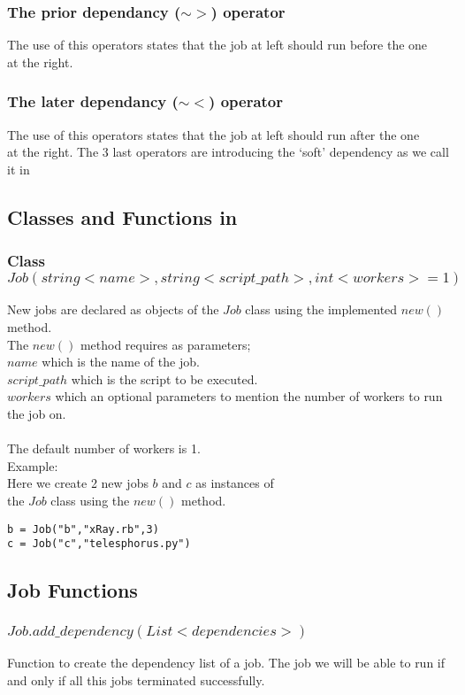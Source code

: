 \subsubsection*{The prior dependancy ($\sim>$) operator}
The use of this operators states that the job at left should run before the one\\
at the right.
\subsubsection*{The later dependancy ($\sim<$) operator}
The use of this operators states that the job at left should run after the one\\
at the right.
The 3 last operators are introducing the `soft' dependency as we call it in \lang{}\\
\subsection*{Classes and Functions in \lang{}}
\subsubsection*{Class $Job(string <name>, string <script\_path>, int <workers>=1)$}
New jobs are declared as objects of the $Job$ class using the implemented $new()$ method.\\
The $new()$ method requires as parameters;\\
$name$ which is the name of the job.\\
$script\_path$ which is the script to be executed.\\
$workers$ which an optional parameters to mention the number of workers to run the job on.\\\\
The default number of workers is 1.\\
Example:\\
Here we create 2 new jobs $b$ and $c$ as instances of \\the $Job$ class using the $new()$ method.
\begin{verbatim}
b = Job("b","xRay.rb",3)
c = Job("c","telesphorus.py")
\end{verbatim}
\subsection*{Job Functions}
\subsubsection*{$Job.add\_dependency(List <dependencies>)$}
Function to create the dependency list of a job. The job we will be
able to run if and only if all this jobs terminated successfully.
